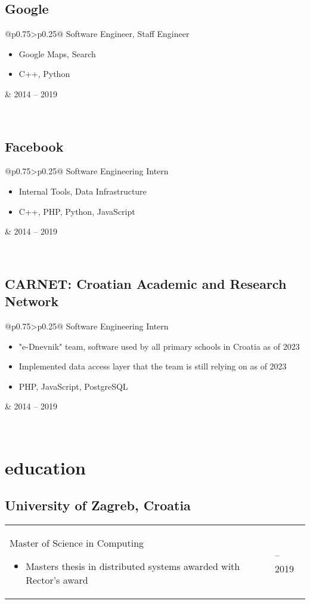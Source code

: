 \documentclass[a4paper]{article}
\makeatletter
\newlength{\tablewidth}
\newenvironment{period}[2]{%
\newcommand{\sarma}{#2}%
\setlength{\tablewidth}{\linewidth}
\addtolength{\tablewidth}{-2\tabcolsep}
\begin{tabular}{@{}p{0.75\tablewidth}>{\raggedleft\arraybackslash}p{0.25\tablewidth}@{}}%
#1 \newline
\begin{itemize}
}{%
\end{itemize} & \sarma \\%
\end{tabular}\\
}
\makeatother
\begin{document}
\subsection{Google}
\begin{period}{Software Engineer, Staff Engineer}{2014 -- 2019}
    \item Google Maps, Search
    \item C++, Python
\end{period}

\subsection{Facebook}
\begin{period}{Software Engineering Intern}{2013, 2014}
    \item Internal Tools, Data Infrastructure
    \item C++, PHP, Python, JavaScript
\end{period}

\subsection{CARNET: Croatian Academic and Research Network}
\begin{period}{Software Engineering Intern}{2010 -- 2013}
    \item "e-Dnevnik" team, software used by all primary schools in Croatia as of 2023
    \item Implemented data access layer that the team is still relying on as of 2023
    \item PHP, JavaScript, PostgreSQL
\end{period}

\section{education}
\subsection{University of Zagreb, Croatia}
\begin{period}{Master of Science in Computing}{2008 -- 2013}
    \item Masters thesis in distributed systems awarded with Rector's award
\end{period}
\end{document}
